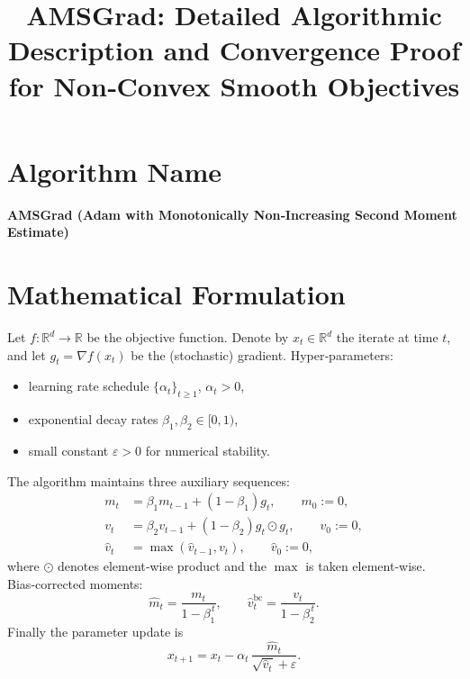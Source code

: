 \documentclass[11pt]{article}
\begin{document}
\title{AMSGrad: Detailed Algorithmic Description and Convergence Proof for Non‑Convex Smooth Objectives}
\author{}
\date{}
\maketitle

\section*{Algorithm Name}
\begin{center}
\textbf{AMSGrad (Adam with Monotonically Non‑Increasing Second Moment Estimate)}
\end{center}

\section*{Mathematical Formulation}
Let $f:\mathbb{R}^d\rightarrow\mathbb{R}$ be the objective function.  
Denote by $x_t\in\mathbb{R}^d$ the iterate at time $t$, and let $g_t=\nabla f(x_t)$ be the (stochastic) gradient.  
Hyper‑parameters:
\begin{itemize}[nosep]
    \item learning rate schedule $\{\alpha_t\}_{t\ge 1}$, $\alpha_t>0$,
    \item exponential decay rates $\beta_1,\beta_2\in[0,1)$,
    \item small constant $\varepsilon>0$ for numerical stability.
\end{itemize}
The algorithm maintains three auxiliary sequences:
\[
\begin{aligned}
m_t &= \beta_1 m_{t-1}+(1-\beta_1)g_t, \qquad m_0:=0,\\[2mm]
v_t &= \beta_2 v_{t-1}+(1-\beta_2)g_t\odot g_t,\qquad v_0:=0,\\[2mm]
\hat v_t &= \max(\hat v_{t-1},v_t),\qquad \hat v_0:=0,
\end{aligned}
\]
where $\odot$ denotes element‑wise product and the $\max$ is taken element‑wise.  
Bias‑corrected moments:
\[
\hat m_t = \frac{m_t}{1-\beta_1^{\,t}}, \qquad 
\hat v_t^{\text{bc}} = \frac{v_t}{1-\beta_2^{\,t}}.
\]
Finally the parameter update is
\[
x_{t+1}=x_t-\alpha_t\,\frac{\hat m_t}{\sqrt{\hat v_t}+\varepsilon}.
\tag{1}
\]

\end{document}
